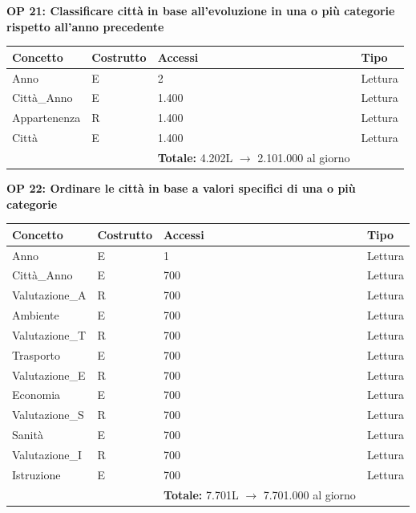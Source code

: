 \documentclass[a4paper,12pt]{report}
\begin{document}
            \textbf{OP 21: Classificare città in base all’evoluzione in una o più categorie rispetto all’anno precedente}
        	\begin{table}[H]
            \centering
             \begin{tabular}{llll}
             \rowcolor{yellow!20} \textbf{Concetto} & \textbf{Costrutto} & \textbf{Accessi} & \textbf{Tipo}\\ [0.5ex] 
             \hline
             Anno & E & 2 & Lettura \\ 
             Città\_Anno & E & 1.400 & Lettura \\ 
             Appartenenza & R & 1.400 & Lettura \\ 
             Città & E & 1.400 & Lettura \\ 
             \hline
                \rowcolor{yellow!20} &   & \textbf{Totale:} 4.202L $\rightarrow$ 2.101.000 al giorno &  \\ [1ex] 
             
             \end{tabular}
            \end{table}

            \textbf{OP 22: Ordinare le città in base a valori specifici di una o più categorie}
        	\begin{table}[H]
            \centering
             \begin{tabular}{llll}
             \rowcolor{yellow!20} \textbf{Concetto} & \textbf{Costrutto} & \textbf{Accessi} & \textbf{Tipo}\\ [0.5ex] 
             \hline
             Anno & E & 1 & Lettura \\ 
             Città\_Anno & E & 700 & Lettura \\ 
             Valutazione\_A & R & 700 & Lettura \\ 
             Ambiente & E & 700 & Lettura \\
             Valutazione\_T & R & 700 & Lettura \\ 
             Trasporto & E & 700 & Lettura \\
             Valutazione\_E & R & 700 & Lettura \\ 
             Economia & E & 700 & Lettura \\
             Valutazione\_S & R & 700 & Lettura \\ 
             Sanità & E & 700 & Lettura \\
             Valutazione\_I & R & 700 & Lettura \\ 
             Istruzione & E & 700 & Lettura \\
             \hline
                \rowcolor{yellow!20} &   & \textbf{Totale:} 7.701L $\rightarrow$ 7.701.000 al giorno &  \\ [1ex] 
             
             \end{tabular}
            \end{table}
\end{document}
